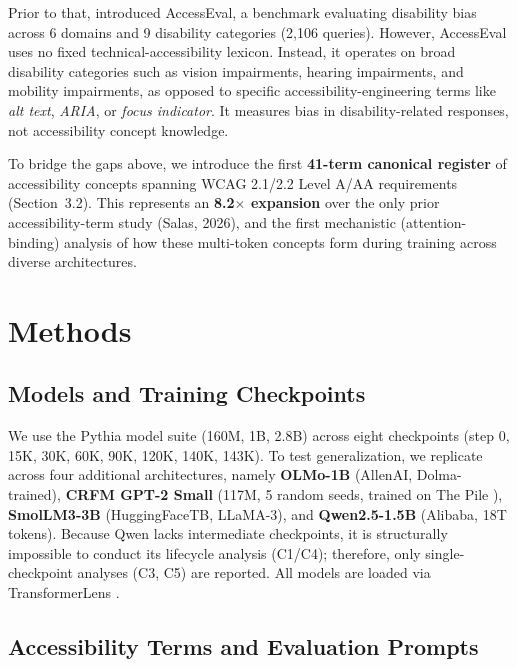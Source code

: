\documentclass[10pt]{article} %
\begin{document}
Prior to that, \citet{panda2025accesseval} introduced AccessEval, a benchmark evaluating disability bias across 6 domains and 9 disability categories (2,106 queries).
However, AccessEval uses no fixed technical-accessibility lexicon. Instead, it operates on broad disability categories such as vision impairments, hearing impairments, and mobility impairments, as opposed to specific accessibility-engineering terms like \textit{alt text}, \textit{ARIA}, or \textit{focus indicator}.
It measures bias in disability-related responses, not accessibility concept knowledge.

To bridge the gaps above, we introduce the first \textbf{41-term canonical register} of accessibility concepts spanning WCAG 2.1/2.2 Level A/AA requirements (Section~3.2).
This represents an \textbf{8.2$\times$ expansion} over the only prior accessibility-term study (Salas, 2026), and the first mechanistic (attention-binding) analysis of how these multi-token concepts form during training across diverse architectures.

\section{Methods}

\subsection{Models and Training Checkpoints}

We use the Pythia model suite \citep{biderman2023pythia} (160M, 1B, 2.8B) across eight checkpoints (step 0, 15K, 30K, 60K, 90K, 120K, 140K, 143K).
To test generalization, we replicate across four additional architectures, namely
\textbf{OLMo-1B} (AllenAI, Dolma-trained), \textbf{CRFM GPT-2 Small} (117M, 5 random seeds, trained on The Pile \citep{gao2020pile}), \textbf{SmolLM3-3B} (HuggingFaceTB, LLaMA-3), and \textbf{Qwen2.5-1.5B} (Alibaba, 18T tokens).
Because Qwen lacks intermediate checkpoints, it is structurally impossible to conduct its lifecycle analysis (C1/C4); therefore, only single-checkpoint analyses (C3, C5) are reported. 
All models are loaded via TransformerLens \citep{nanda2023transformerlens}.

\subsection{Accessibility Terms and Evaluation Prompts}
\end{document}
